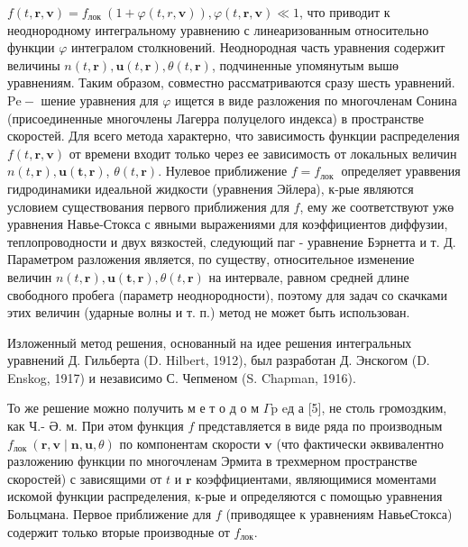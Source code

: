 \documentclass[10pt]{article}
\begin{document}
$f(t, \boldsymbol{r}, \boldsymbol{v})=f_{\text {лок }}(1+\varphi(t, r, \boldsymbol{v})), \varphi(t, \boldsymbol{r}, \boldsymbol{v}) \ll 1$, что приводит к неоднородному интегральному уравнению с линеаризованным относительно функции $\varphi$ интегралом столкновений. Неоднородная часть уравнения содержит величины $n(t, \boldsymbol{r}), \boldsymbol{u}(t, \boldsymbol{r}), \theta(t, \boldsymbol{r})$, подчиненные упомянутым вышө уравнениям. Таким образом, совместно рассматриваются сразу шесть уравнений. $\mathrm{Pe}-$ шение уравнения для $\varphi$ ищется в виде разложения по многочленам Сонина (присоединенные многочлены Лагерра полуцелого индекса) в пространстве скоростей. Для всего метода характерно, что зависимость функции распределения $f(t, \boldsymbol{r}, \boldsymbol{v})$ от времени входит только через ее зависимость от локальных величин $n(t, \boldsymbol{r}), \boldsymbol{u}(\boldsymbol{t}, \boldsymbol{r})$, $\theta(t, \boldsymbol{r})$. Нулевое приближение $f=f_{\text {лок }}$ определяет ураввения гидродинамики идеальной жидкости (уравнения Эйлера), к-рые являются условием существования первого приближения для $f$, ему же соответствуют ужө уравнения Навье-Стокса с явными выражениями для коэффициентов диффузии, теплопроводности и двух вязкостей, следующий паг - уравнение Бэрнетта и т. Д. Параметром разложения является, по существу, относительное изменение величин $n(t, \boldsymbol{r}), \boldsymbol{u}(\boldsymbol{t}, \boldsymbol{r}), \theta(t, \boldsymbol{r})$ на интервале, равном средней длине свободного пробега (параметр неоднородности), поэтому для задач со скачками этих величин (ударные волны и т. п.) метод не может быть использован.



Изложенный метод решения, основанный на идее решения интегральных уравнений Д. Гильберта (D. Hilbert, 1912), был разработан Д. Энскогом (D. Enskog, 1917) и независимо С. Чепменом (S. Chapman, 1916).



То же решение можно получить м е т о д о м $\Gamma \mathrm{p}$ eд а [5], не столь громоздким, как Ч.- Ә. м. При әтом функция $f$ представляется в виде ряда по производным $f_{\text {лок }}(\boldsymbol{r}, \boldsymbol{v} \mid \boldsymbol{n}, \boldsymbol{u}, \theta)$ по компонентам скорости $\boldsymbol{v}$ (что фактически әквивалентно разложению функции по многочленам Эрмита в трехмерном пространстве скоростей) с зависящими от $t$ и $\boldsymbol{r}$ коэффициентами, являющимися моментами искомой функции распределения, к-рые и определяются с помощью уравнения Больцмана. Первое приближение для $f$ (приводящее к уравнениям НавьеСтокса) содержит только вторые производные от $f_{л о к}$.
\end{document}
